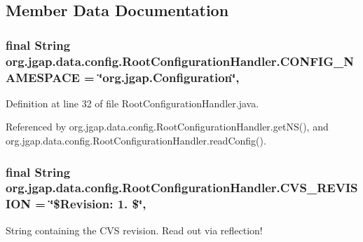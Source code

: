 \subsection{Member Data Documentation}
\hypertarget{classorg_1_1jgap_1_1data_1_1config_1_1_root_configuration_handler_a0860e45eacb4498af65851fd0b1ac7fc}{
\subsubsection[{C\-O\-N\-F\-I\-G\-\_\-\-N\-A\-M\-E\-S\-P\-A\-C\-E}]{\setlength{\rightskip}{0pt plus 5cm}final String org.\-jgap.\-data.\-config.\-Root\-Configuration\-Handler.\-C\-O\-N\-F\-I\-G\-\_\-\-N\-A\-M\-E\-S\-P\-A\-C\-E = \char`\"{}org.\-jgap.\-Configuration\char`\"{}\hspace{0.3cm}{\ttfamily [static]}, {\ttfamily [private]}}}\label{classorg_1_1jgap_1_1data_1_1config_1_1_root_configuration_handler_a0860e45eacb4498af65851fd0b1ac7fc}


Definition at line 32 of file Root\-Configuration\-Handler.\-java.



Referenced by org.\-jgap.\-data.\-config.\-Root\-Configuration\-Handler.\-get\-N\-S(), and org.\-jgap.\-data.\-config.\-Root\-Configuration\-Handler.\-read\-Config().

\hypertarget{classorg_1_1jgap_1_1data_1_1config_1_1_root_configuration_handler_a450bd9651df5506c2650986e211a54d6}{
\subsubsection[{C\-V\-S\-\_\-\-R\-E\-V\-I\-S\-I\-O\-N}]{\setlength{\rightskip}{0pt plus 5cm}final String org.\-jgap.\-data.\-config.\-Root\-Configuration\-Handler.\-C\-V\-S\-\_\-\-R\-E\-V\-I\-S\-I\-O\-N = \char`\"{}\$Revision\-: 1. \$\char`\"{}\hspace{0.3cm}{\ttfamily [static]}, {\ttfamily [private]}}}\label{classorg_1_1jgap_1_1data_1_1config_1_1_root_configuration_handler_a450bd9651df5506c2650986e211a54d6}
String containing the C\-V\-S revision. Read out via reflection! 

